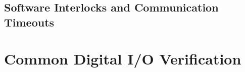 \subsection{Software Interlocks and Communication Timeouts}
\label{subsec:plat-interlocks}



\section{Common Digital I/O Verification}
\label{sec:plat-io-test}

